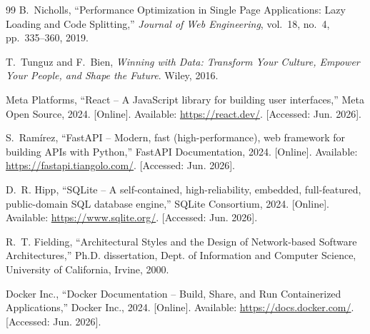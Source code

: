 \documentclass{book}
\begin{document}
\begin{thebibliography}{99}
B.~Nicholls, ``Performance Optimization in Single Page Applications: Lazy Loading and Code Splitting,'' \textit{Journal of Web Engineering}, vol.~18, no.~4, pp.~335--360, 2019.

T.~Tunguz and F.~Bien, \textit{Winning with Data: Transform Your Culture, Empower Your People, and Shape the Future}. Wiley, 2016.

Meta Platforms, ``React -- A JavaScript library for building user interfaces,'' Meta Open Source, 2024. [Online]. Available: \url{https://react.dev/}. [Accessed: Jun. 2026].

S.~Ram\'{i}rez, ``FastAPI -- Modern, fast (high-performance), web framework for building APIs with Python,'' FastAPI Documentation, 2024. [Online]. Available: \url{https://fastapi.tiangolo.com/}. [Accessed: Jun. 2026].

D.~R. Hipp, ``SQLite -- A self-contained, high-reliability, embedded, full-featured, public-domain SQL database engine,'' SQLite Consortium, 2024. [Online]. Available: \url{https://www.sqlite.org/}. [Accessed: Jun. 2026].

R.~T. Fielding, ``Architectural Styles and the Design of Network-based Software Architectures,'' Ph.D. dissertation, Dept. of Information and Computer Science, University of California, Irvine, 2000.

Docker Inc., ``Docker Documentation -- Build, Share, and Run Containerized Applications,'' Docker Inc., 2024. [Online]. Available: \url{https://docs.docker.com/}. [Accessed: Jun. 2026].

\end{thebibliography}
\end{document}
